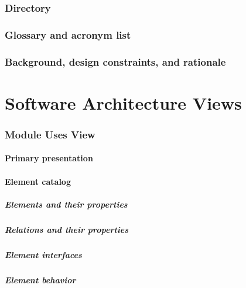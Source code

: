 \documentclass[a4paper,10pt]{report}
\begin{document}
\section{Directory}

\section{Glossary and acronym list}

\section{Background, design constraints, and rationale}



\part{Software Architecture Views}

\section{Module Uses View}

\subsection{Primary presentation}



\subsection{Element catalog}

\subsubsection{Elements and their properties}

\subsubsection{Relations and their properties}

\subsubsection{Element interfaces}

\subsubsection{Element behavior}
\end{document}
